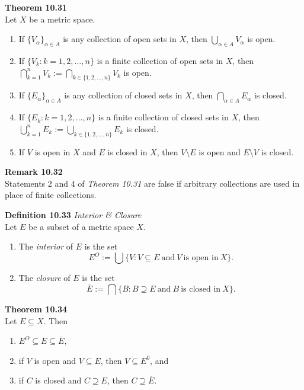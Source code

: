 \documentclass[8pt,landscape]{article}
\begin{document}
\begin{multicols}{3}
\textbf{Theorem 10.31} \\
Let $X$ be a metric space.
\begin{enumerate}
    \item If ${\{V_\alpha\}}_{\alpha \in A}$ is any collection of open sets in $X$,
        then $\bigcup_{\alpha \in A} V_\alpha$
        is open.
    \item If $\{V_k : k = 1, 2, \ldots, n\}$ is a finite collection of open sets in
        $X$, then
            $\bigcap_{k=1}^n V_k := \bigcap_{k \in \{1, 2, \ldots, n\}} V_k$
        is open.
    \item If ${\{E_\alpha\}}_{\alpha \in A}$ is any collection of closed sets in $X$,
        then $\bigcap_{\alpha \in A} E_\alpha$ is closed.
    \item If $\{E_k : k = 1, 2, \ldots, n\}$ is a finite collection of closed sets in
        $X$, then
            $\bigcup_{k=1}^n E_k := \bigcup_{k \in \{1, 2, \ldots, n\}} E_k$
        is closed.
    \item If $V$ is open in $X$ and $E$ is closed in $X$, then $V \setminus E$
        is open and $E \setminus V$ is closed.
\end{enumerate}


\textbf{Remark 10.32} \\
Statements 2 and 4 of \emph{Theorem 10.31} are false if arbitrary collections are used
in place of finite collections.


\textbf{Definition 10.33} \emph{Interior \& Closure} \\
Let $E$ be a subset of a metric space $X$.
\begin{enumerate}
    \item The \emph{interior} of $E$ is the set
        \[
            E^O := \bigcup \{ V : V \subseteq E \
            \text{and} \ V \ \text{is open in} \ X\}.
        \]
    \item The \emph{closure} of $E$ is the set
        \[
            \overline{E} := \bigcap \{ B : B \supseteq E \
            \text{and} \ B \ \text{is closed in} \ X\}.
        \]
\end{enumerate}

\textbf{Theorem 10.34} \\
Let $E \subseteq X$.
Then
\begin{enumerate}
    \item $E^O \subseteq E \subseteq \overline{E}$,
    \item if $V$ is open and $V \subseteq E$, then $V \subseteq E^0$, and
    \item if $C$ is closed and $C \supseteq E$, then $C \supseteq \overline{E}$.
\end{enumerate}



\end{multicols}
\end{document}
